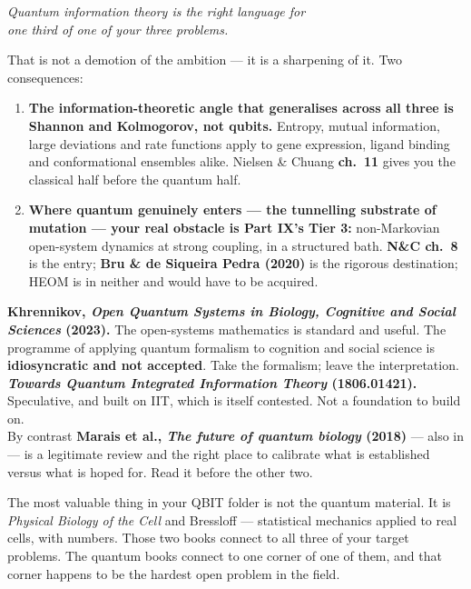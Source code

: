 \begin{keyidea}[title={The honest shape of QBIT}]
\begin{center}\itshape\large
Quantum information theory is the right language for\\one third of one of your three problems.
\end{center}
\vspace{3pt}
That is not a demotion of the ambition --- it is a sharpening of it. Two consequences:
\begin{enumerate}[label=\textbf{\arabic*.}]
\item \textbf{The information-theoretic angle that generalises across all three is Shannon and
 Kolmogorov, not qubits.} Entropy, mutual information, large deviations and rate functions apply to
 gene expression, ligand binding and conformational ensembles alike. Nielsen \& Chuang \textbf{ch.~11}
 gives you the classical half before the quantum half.
\item \textbf{Where quantum genuinely enters --- the tunnelling substrate of mutation --- your real
 obstacle is Part IX's Tier 3:} non-Markovian open-system dynamics at strong coupling, in a
 structured bath. \textbf{N\&C ch.~8} is the entry; \textbf{Bru \& de Siqueira Pedra (2020)} is the
 rigorous destination; HEOM is in neither and would have to be acquired.
\end{enumerate}
\end{keyidea}

\begin{critbox}[title={Two books in QBIT-HIS to read with your guard up}]
\textbf{Khrennikov, \textit{Open Quantum Systems in Biology, Cognitive and Social Sciences} (2023).}
The open-systems mathematics is standard and useful. The programme of applying quantum formalism to
cognition and social science is \textbf{idiosyncratic and not accepted}. Take the formalism; leave
the interpretation.\\[5pt]
\textbf{\textit{Towards Quantum Integrated Information Theory} (1806.01421).} Speculative, and built
on IIT, which is itself contested. Not a foundation to build on.\\[5pt]
By contrast \textbf{Marais et al., \textit{The future of quantum biology} (2018)} --- also in
 --- is a legitimate review and the right place to calibrate what is established versus
what is hoped for. Read it before the other two.
\end{critbox}

\begin{plain}
The most valuable thing in your QBIT folder is not the quantum material. It is \textit{Physical
Biology of the Cell} and Bressloff --- statistical mechanics applied to real cells, with numbers.
Those two books connect to all three of your target problems. The quantum books connect to one
corner of one of them, and that corner happens to be the hardest open problem in the field.
\end{plain}
